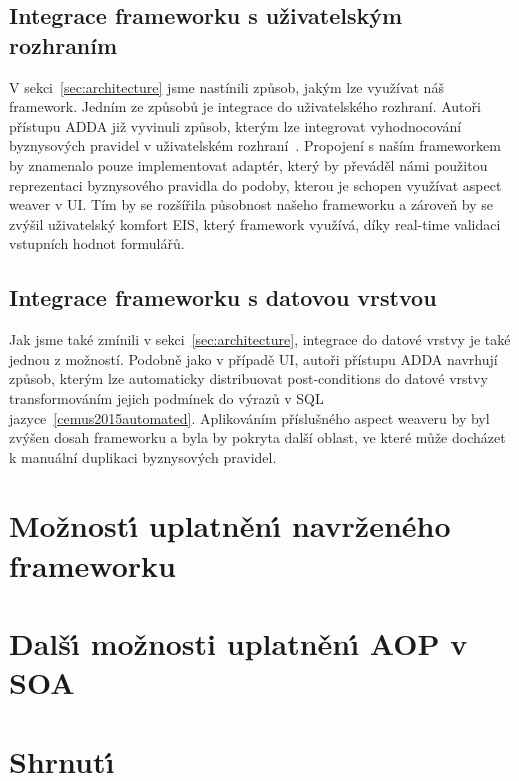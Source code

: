 \subsection{Integrace frameworku s uživatelským rozhraním}

V sekci~\ref{sec:architecture} jsme nastínili způsob, jakým lze využívat náš framework.
Jedním ze způsobů je integrace do uživatelského rozhraní. Autoři přístupu \gls{ADDA} již
vyvinuli způsob, kterým lze integrovat vyhodnocování
byznysových pravidel v uživatelském rozhraní~\cite{cemus2017separation}. Propojení s
naším frameworkem by znamenalo pouze implementovat adaptér, který by převáděl námi
použitou reprezentaci byznysového pravidla do podoby, kterou je schopen využívat
aspect weaver v \gls{UI}. Tím by se rozšířila působnost našeho frameworku a zároveň
by se zvýšil uživatelský komfort \gls{EIS}, který framework využívá, díky real-time
validaci vstupních hodnot formulářů.

\subsection{Integrace frameworku s datovou vrstvou}

Jak jsme také zmínili v sekci~\ref{sec:architecture}, integrace do datové vrstvy
je také jednou z možností. Podobně jako v případě \gls{UI}, autoři přístupu
\gls{ADDA} navrhují způsob, kterým lze automaticky distribuovat post-conditions
do datové vrstvy transformováním jejich podmínek do výrazů v \gls{SQL}
jazyce~\ref{cemus2015automated}. Aplikováním příslušného aspect weaveru by byl
zvýšen dosah frameworku a byla by pokryta další oblast, ve které může docházet
k manuální duplikaci byznysových pravidel.

\section{Možnost\'{\i} uplatněn\'{\i} navrženého frameworku}

\section{Dalš\'{\i} možnosti uplatněn\'{\i} \gls{AOP} v \gls{SOA}}


\section{Shrnut\'{\i}}

